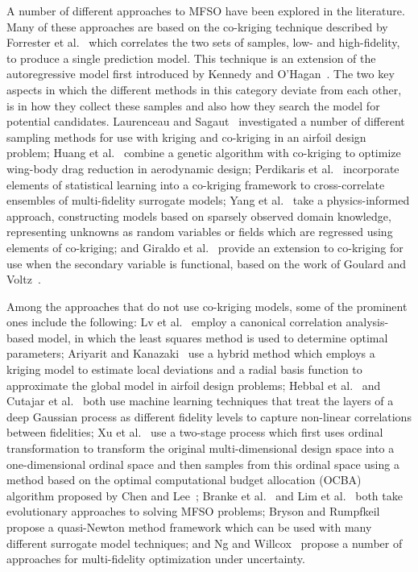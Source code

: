A number of different approaches to MFSO have been explored in the literature. Many of these approaches are based on the co-kriging technique described by Forrester et al.~\cite{forrester2007multi} which correlates the two sets of samples, low- and high-fidelity, to produce a single prediction model. This technique is an extension of the autoregressive model first introduced by Kennedy and O'Hagan~\cite{kennedy2000predicting}. The two key aspects in which the different methods in this category deviate from each other, is in how they collect these samples and also how they search the model for potential candidates. Laurenceau and Sagaut~\cite{laurenceau2008building} investigated a number of different sampling methods for use with kriging and co-kriging in an airfoil design problem; Huang et al.~\cite{huang2013research} combine a genetic algorithm with co-kriging to optimize wing-body drag reduction in aerodynamic design; Perdikaris et al.~\cite{perdikaris2015multi} incorporate elements of statistical learning into a co-kriging framework to cross-correlate ensembles of multi-fidelity surrogate models; Yang et al.~\cite{yang2019physics} take a physics-informed approach, constructing models based on sparsely observed domain knowledge, representing unknowns as random variables or fields which are regressed using elements of co-kriging; and Giraldo et al.~\cite{giraldo2020cokriging} provide an extension to co-kriging for use when the secondary variable is functional, based on the work of Goulard and Voltz~\cite{goulard1993geostatistical}.

Among the approaches that do not use co-kriging models, some of the prominent ones include the following: Lv et al.~\cite{lv2021multi} employ a canonical correlation analysis-based model, in which the least squares method is used to determine optimal parameters; Ariyarit and Kanazaki~\cite{ariyarit2017multi} use a hybrid method which employs a kriging model to estimate local deviations and a radial basis function to approximate the global model in airfoil design problems; Hebbal et al.~\cite{hebbal2021multi} and Cutajar et al.~\cite{cutajar2019deep} both use machine learning techniques that treat the layers of a deep Gaussian process as different fidelity levels to capture non-linear correlations between fidelities; Xu et al.~\cite{xu2016mo2tos} use a two-stage process which first uses ordinal transformation to transform the original multi-dimensional design space into a one-dimensional ordinal space and then samples from this ordinal space using a method based on the optimal computational budget allocation (OCBA) algorithm proposed by Chen and Lee~\cite{chen2011stochastic}; Branke et al.~\cite{branke2016efficient} and Lim et al.~\cite{lim2008evolutionary} both take evolutionary approaches to solving MFSO problems; Bryson and Rumpfkeil~\cite{bryson2018multifidelity} propose a quasi-Newton method framework which can be used with many different surrogate model techniques; and Ng and Willcox~\cite{ng2014multifidelity} propose a number of approaches for multi-fidelity optimization under uncertainty.

